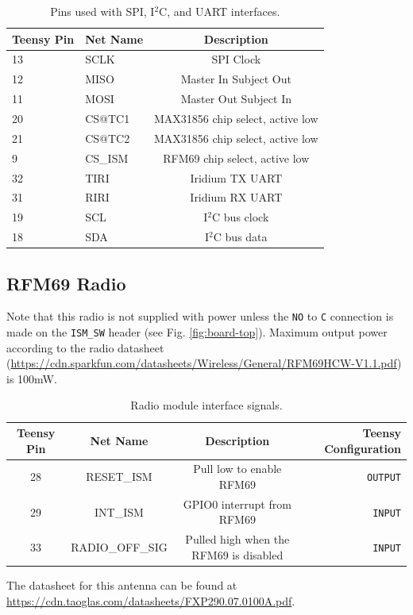 \documentclass{article}
\begin{document}
\begin{table}[H]
    \centering
    \begin{tabular}{l|l|c}
   Teensy Pin & Net Name &  Description \\
    \hline \hline
    
        \hline
    13 & SCLK     &  SPI Clock \\
    12 & MISO     &  Master In Subject Out \\
    11 & MOSI     &  Master Out Subject In \\
    20 & CS@TC1 & MAX31856 chip select, active low \\
    21 & CS@TC2 & MAX31856 chip select, active low  \\
    9 & CS\_ISM     & RFM69 chip select, active low  \\
    \hline
    32 & TIRI     & Iridium TX UART \\
    31 & RIRI      & Iridium RX UART \\
    \hline
    19 & SCL & I$^2$C bus clock \\
    18 & SDA & I$^2$C bus data
    \end{tabular}
    \caption{Pins used with SPI, I$^2$C, and UART interfaces.}
    \label{tab:pins_serial}
\end{table}

\subsection{RFM69 Radio}
Note that this radio is not supplied with power unless the \texttt{NO} to \texttt{C} connection is made on the \texttt{ISM\_SW} header (see Fig. \ref{fig:board-top}).  Maximum output power according to the radio datasheet (\url{https://cdn.sparkfun.com/datasheets/Wireless/General/RFM69HCW-V1.1.pdf}) is 100mW.
\begin{table}[H]
    \centering
    \begin{tabular}{c|c|c|r}
    Teensy Pin & Net Name  & Description   & Teensy Configuration \\
    \hline 
    28 & RESET\_ISM  &  Pull low to enable RFM69   & \texttt{OUTPUT} \\
    29 & INT\_ISM    &  GPIO0 interrupt from RFM69 & \texttt{INPUT} \\
    33 & RADIO\_OFF\_SIG & Pulled high when the RFM69 is disabled & \texttt{INPUT} \\
    \end{tabular}
    \caption{Radio module interface signals.}
    \label{tab:pins_radio}
\end{table}
The datasheet for this antenna can be found at  \url{https://cdn.taoglas.com/datasheets/FXP290.07.0100A.pdf}. 
\end{document}
